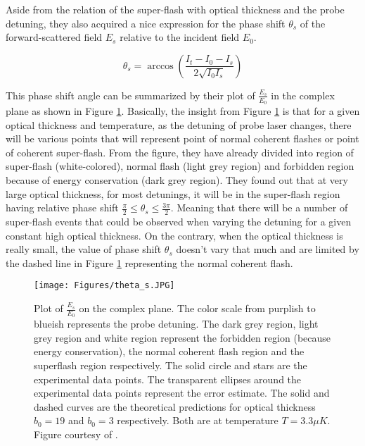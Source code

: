 Aside from the relation of the super-flash with optical thickness and the probe detuning, they also acquired a nice expression for the phase shift $\theta_{s}$ of the forward-scattered field $E_{s}$ relative to the incident field $E_{0}$. 

\begin{equation}
    \theta_{s} = \arccos({\frac{I_{t} - I_{0} - I_{s}}{2 \sqrt{I_{0} I_{s}}}})
\end{equation}

This phase shift angle can be summarized by their plot of $\frac{E_{s}}{E_{0}}$ in the complex plane as shown in Figure \ref{fig: theta_s}. Basically, the insight from Figure \ref{fig: theta_s} is that for a given optical thickness and temperature, as the detuning of probe laser changes, there will be various points that will represent point of normal coherent flashes or point of coherent super-flash. From the figure, they have already divided into region of super-flash (white-colored), normal flash (light grey region) and forbidden region because of energy conservation (dark grey region). They found out that at very large optical thickness, for most detunings, it will be in the super-flash region having relative phase shift $\frac{\pi}{2} \leq \theta_{s} \leq \frac{3\pi}{2}$. Meaning that there will be a number of super-flash events that could be observed when varying the detuning for a given constant high optical thickness. On the contrary, when the optical thickness is really small, the value of phase shift $\theta_{s}$ doesn't vary that much and are limited by the dashed line in Figure \ref{fig: theta_s} representing the normal coherent flash.

\begin{figure}
    \centering
    \texttt{[image: Figures/theta\_s.JPG]}
    \caption{Plot of $\frac{E_{s}}{E_{0}}$ on the complex plane. The color scale from purplish to blueish represents the probe detuning. The dark grey region, light grey region and white region represent the forbidden region (because energy conservation), the normal coherent flash region and the superflash region respectively. The solid circle and stars are the experimental data points. The transparent ellipses around the experimental data points represent the error estimate. The solid and dashed curves are the theoretical predictions for optical thickness $b_{0} = 19$ and $b_{0} = 3$ respectively. Both are at temperature $T = 3.3\mu K$. Figure courtesy of \protect\cite{Kwong2014}.}
    \label{fig: theta_s}
\end{figure}

